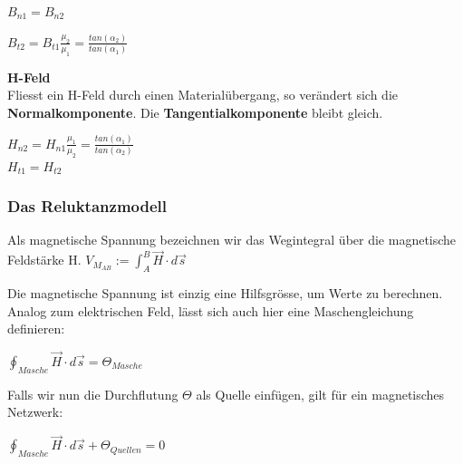 \formulaBegin
$ \displaystyle B_{n1} = B_{n2}$
\\ \fspace

 $\displaystyle B_{t2} = B_{t1} \frac{\mu_2}{\mu_1}  = \frac{tan(\alpha_2)}{tan(\alpha_1)}$
\formulaEnd

\textbf{H-Feld} \\
Fliesst ein H-Feld durch einen Materialübergang, so verändert sich die \textbf{Normalkomponente}. Die \textbf{Tangentialkomponente} bleibt gleich.

\begin{center}
\end{center}

\formulaBegin

$\displaystyle H_{n2} = H_{n1} \frac{\mu_1}{\mu_2} = \frac{tan(\alpha_1)}{tan(\alpha_2)} $ \\
\fspace
$ \displaystyle H_{t1} = H_{t2}$
\formulaEnd




\subsubsection{Das Reluktanzmodell}

	\beginip
	Als magnetische Spannung bezeichnen wir das Wegintegral über die magnetische Feldstärke H.
	\formulaBegin
	$\displaystyle V_{M_{AB}} := \int_A^B \vec{H} \cdot d\vec{s}$
	\formulaEnd

	Die magnetische Spannung ist einzig eine Hilfsgrösse, um Werte zu berechnen. \\
	Analog zum elektrischen Feld, lässt sich auch hier eine Maschengleichung definieren: \\
	\begin{center}
		$\displaystyle \oint_{Masche} \vec{H} \cdot d\vec{s} = \Theta_{Masche}$
	\end{center}
		Falls wir nun die Durchflutung $\Theta$ als Quelle einfügen, gilt für ein magnetisches Netzwerk:
		\begin{center}
			$\displaystyle \oint_{Masche} \vec{H} \cdot d\vec{s} + \Theta_{Quellen} = 0$
		\end{center}
	\iend

